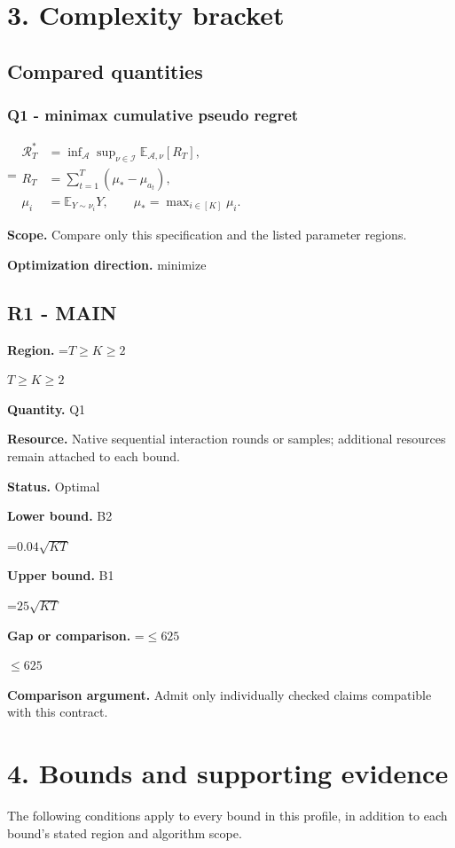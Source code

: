 \documentclass[10pt,a4paper]{article}
\newcommand{\AtlasMath}[1]{\par\begingroup\centering\setbox0=\hbox{$\displaystyle #1$}\ifdim\wd0>1.4\linewidth\typeout{ATLAS WIDE FORMULA: \the\wd0}\fi\ifdim\wd0>\linewidth\resizebox{\linewidth}{!}{\box0}\else\box0\fi\par\endgroup}
\newcommand{\AtlasInlineMath}[1]{\begingroup\setbox0=\hbox{$#1$}\ifdim\wd0>.4\linewidth\endgroup\AtlasMath{#1}\else\endgroup$#1$\fi}
\begin{document}
\section{3. Complexity bracket}
\subsection{Compared quantities}
\subsubsection{Q1 - minimax cumulative pseudo regret}
\AtlasMath{\begin{aligned}\mathcal R_T^*&=\inf_{\mathcal A}\sup_{\nu\in\mathcal I}\mathbb E_{\mathcal A,\nu}[R_T],\\ R_T&=\sum_{t=1}^T(\mu_*-\mu_{a_t}),\\ \mu_i&=\mathbb E_{Y\sim\nu_i}Y,\qquad\mu_*=\max_{i\in[K]}\mu_i.\end{aligned}}
\textbf{Scope.} Compare only this specification and the listed parameter regions.

\textbf{Optimization direction.} minimize

\subsection{R1 - MAIN}
\textbf{Region.} \AtlasInlineMath{T\ge K\ge 2}

\textbf{Quantity.} Q1

\textbf{Resource.} Native sequential interaction rounds or samples; additional resources remain attached to each bound.

\textbf{Status.} Optimal

\textbf{Lower bound.} B2

\AtlasMath{0.04\sqrt{KT}}
\textbf{Upper bound.} B1

\AtlasMath{25\sqrt{KT}}
\textbf{Gap or comparison.} \AtlasInlineMath{\le 625}

\textbf{Comparison argument.} Admit only individually checked claims compatible with this contract.

\section{4. Bounds and supporting evidence}
The following conditions apply to every bound in this profile, in addition to each bound's stated region and algorithm scope.
\end{document}
